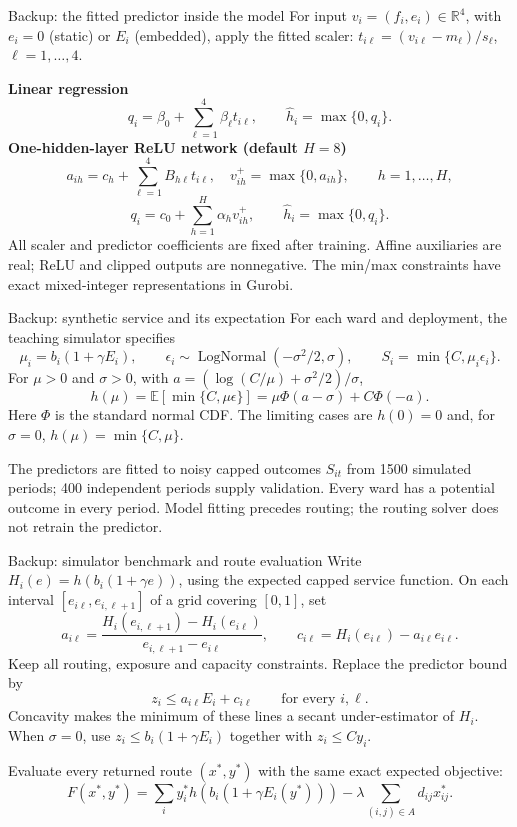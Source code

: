 \begin{frame}{Backup: the fitted predictor inside the model}
  \small
  For input $v_i=(f_i,e_i)\in\mathbb R^4$, with $e_i=0$ (static) or $E_i$ (embedded),
  apply the fitted scaler: $t_{i\ell}=(v_{i\ell}-m_\ell)/s_\ell$, $\ell=1,\ldots,4$.
  \par\vspace{2mm}
  \textbf{Linear regression}
  \[
    q_i=\beta_0+\sum_{\ell=1}^4\beta_\ell t_{i\ell},\qquad
    \widehat h_i=\max\{0,q_i\}.
  \]
  \textbf{One-hidden-layer ReLU network (default $H=8$)}
  \[
    a_{ih}=c_h+\sum_{\ell=1}^4B_{h\ell}t_{i\ell},\quad
    v^+_{ih}=\max\{0,a_{ih}\},\qquad h=1,\ldots,H,
  \]
  \[
    q_i=c_0+\sum_{h=1}^H\alpha_h v^+_{ih},\qquad
    \widehat h_i=\max\{0,q_i\}.
  \]
  All scaler and predictor coefficients are fixed after training. Affine auxiliaries are real; ReLU and clipped outputs are nonnegative. The min/max constraints have exact mixed-integer representations in Gurobi.
\end{frame}

\begin{frame}{Backup: synthetic service and its expectation}
  \small
  For each ward and deployment, the teaching simulator specifies
  \[
    \mu_i=b_i(1+\gamma E_i),\qquad
    \epsilon_i\sim\operatorname{LogNormal}(-\sigma^2/2,\sigma),\qquad
    S_i=\min\{C,\mu_i\epsilon_i\}.
  \]
  For $\mu>0$ and $\sigma>0$, with $a=(\log(C/\mu)+\sigma^2/2)/\sigma$,
  \[
    h(\mu)=\mathbb E[\min\{C,\mu\epsilon\}]
           =\mu\Phi(a-\sigma)+C\Phi(-a).
  \]
  Here $\Phi$ is the standard normal CDF. The limiting cases are
  $h(0)=0$ and, for $\sigma=0$, $h(\mu)=\min\{C,\mu\}$.
  \par\vspace{4mm}
  The predictors are fitted to noisy capped outcomes $S_{it}$ from 1500 simulated
  periods; 400 independent periods supply validation. Every ward has a potential
  outcome in every period. Model fitting precedes routing; the routing solver does not retrain the predictor.
\end{frame}

\begin{frame}{Backup: simulator benchmark and route evaluation}
  \small
  Write $H_i(e)=h(b_i(1+\gamma e))$, using the expected capped service function.
  On each interval $[e_{i\ell},e_{i,\ell+1}]$ of a grid covering $[0,1]$, set
  \[
    a_{i\ell}=\frac{H_i(e_{i,\ell+1})-H_i(e_{i\ell})}{e_{i,\ell+1}-e_{i\ell}},
    \qquad c_{i\ell}=H_i(e_{i\ell})-a_{i\ell}e_{i\ell}.
  \]
  Keep all routing, exposure and capacity constraints. Replace the predictor bound by
  \[
    z_i\le a_{i\ell}E_i+c_{i\ell}\qquad\text{for every }i,\ell.
  \]
  Concavity makes the minimum of these lines a secant under-estimator of $H_i$.
  When $\sigma=0$, use $z_i\le b_i(1+\gamma E_i)$ together with $z_i\le Cy_i$.
  \par\vspace{2mm}
  Evaluate every returned route $(x^*,y^*)$ with the same exact expected objective:
  \[
    F(x^*,y^*)=\sum_i y_i^*h\!\left(b_i(1+\gamma E_i(y^*))\right)
              -\lambda\sum_{(i,j)\in A}d_{ij}x_{ij}^*.
  \]
\end{frame}

